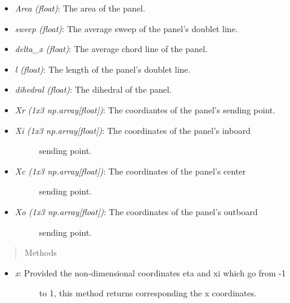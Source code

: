 \documentclass[letterpaper,10pt,english]{sphinxmanual}
\begin{document}
\begin{fulllineitems}
\begin{itemize}
\begin{description}
\end{description}

\item {} 
\emph{Area (float)}: The area of the panel.

\item {} 
\emph{sweep (float)}: The average sweep of the panel's doublet line.

\item {} 
\emph{delta\_x (float)}: The average chord line of the panel.

\item {} 
\emph{l (float)}: The length of the panel's doublet line.

\item {} 
\emph{dihedral (float)}: The dihedral of the panel.

\item {} 
\emph{Xr (1x3 np.array{[}float{]})}: The coordiantes of the panel's sending point.

\item {} \begin{description}
\item[{\emph{Xi (1x3 np.array{[}float{]})}: The coordinates of the panel's inboard}] \leavevmode
sending point.

\end{description}

\item {} \begin{description}
\item[{\emph{Xc (1x3 np.array{[}float{]})}: The coordinates of the panel's center}] \leavevmode
sending point.

\end{description}

\item {} \begin{description}
\item[{\emph{Xo (1x3 np.array{[}float{]})}: The coordinates of the panel's outboard}] \leavevmode
sending point.

\end{description}

\end{itemize}
\begin{quote}\begin{description}
\item[{Methods}] \leavevmode
\end{description}\end{quote}
\begin{itemize}
\item {} \begin{description}
\item[{\emph{x}: Provided the non-dimensional coordinates eta and xi which go from -1}] \leavevmode
to 1, this method returns corresponding the x coordinates.


\end{description}
\end{itemize}
\end{fulllineitems}
\end{document}
